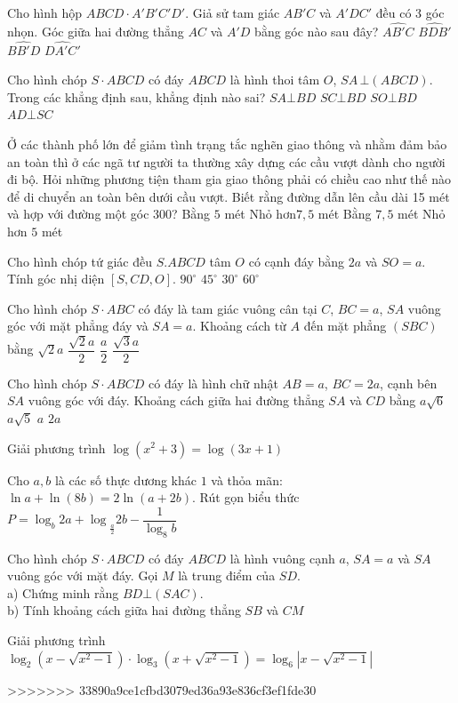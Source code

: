 \begin{ex}
Cho hình hộp $ABCD \cdot A'B'C'D'$. Giả sử tam giác $AB'C$ và $A'DC'$ đều có 3 góc nhọn. Góc giữa hai đường thẳng $AC$ và $A'D$ bằng góc nào sau đây?
\choice
{$\widehat{AB'C}$}
{$\widehat{BDB'}$}
{$\widehat{BB'D}$}
{$\widehat{DA'C'}$}
\end{ex}
\begin{ex}
Cho hình chóp $S \cdot ABCD$ có đáy $ABCD$ là hình thoi tâm $O$, $SA\,\bot (ABCD)$. Trong các khẳng định sau, khẳng định nào sai?
\choice
{$SA\bot BD$}
{$SC\bot BD$}
{$SO\bot BD$}
{$AD\bot SC$}
\end{ex}
\begin{ex}
Ở các thành phố lớn để giảm tình trạng tắc nghẽn giao thông và nhằm đảm bảo an toàn thì ở các ngã tư người ta thường xây dựng các cầu vượt dành cho người đi bộ. Hỏi những phương tiện tham gia giao thông phải có chiều cao như thế nào để di chuyển an toàn bên dưới cầu vượt. Biết rằng đường dẫn lên cầu dài 15 mét và hợp với đường một góc 300?
\choice
{Bằng $5$ mét}
{Nhỏ hơn$7{,}5$ mét}
{Bằng $7{,}5$ mét}
{Nhỏ hơn $5$ mét}
\end{ex}
\begin{ex}
Cho hình chóp tứ giác đều $S.ABCD$ tâm $O$ có cạnh đáy bằng $2a$ và $SO=a$. Tính góc nhị diện $\left[S, CD, O\right]$.
\choice
{$90^\circ $}
{$45^\circ $}
{$30^\circ$}
{$60^\circ $}
\end{ex}
\begin{ex}
Cho hình chóp $S \cdot ABC$ có đáy là tam giác vuông cân tại $C$, $BC=a$, $SA$ vuông góc với mặt phẳng đáy và $SA=a$. Khoảng cách từ $A$ đến mặt phẳng $(SBC)$ bằng
\choice
{$\sqrt{2}a$}
{$\dfrac{\sqrt{2}a}{2}$}
{$\dfrac{a}{2}$}
{$\dfrac{\sqrt{3}a}{2}$}
\end{ex}
\begin{ex}
Cho hình chóp $S \cdot ABCD$ có đáy là hình chữ nhật $AB=a$, $BC=2a$, cạnh bên $SA$ vuông góc với đáy. Khoảng cách giữa hai đường thẳng $SA$ và $CD$ bằng
\choice
{$a\sqrt{6}$}
{$a\sqrt{5}$}
{$a$}
{$2a$}
\end{ex}
\begin{ex}
Giải phương trình $\log \left(x^2+3\right)=\log (3x+1)$
\end{ex}
\begin{ex}
Cho $a,b$ là các số thực dương khác $1$ và thỏa mãn: $\ln a+\ln (8b)=2\ln (a+2b)$.
Rút gọn biểu thức $P={{\log _b2a+\log }_{\tfrac{a}{2}}}2b-\dfrac{1}{\log _8b}$
\end{ex}
\begin{ex}
Cho hình chóp $S \cdot ABCD$ có đáy $ABCD$ là hình vuông cạnh $a$, $SA=a$ và $SA$ vuông góc với mặt đáy. Gọi $M$ là trung điểm của $SD$.\\ 
a) Chứng minh rằng $BD\bot (SAC)$.\\
b) Tính khoảng cách giữa hai đường thẳng $SB$ và $CM$\\
\end{ex}
\begin{ex}
Giải phương trình $\log _2\left(x-\sqrt{x^2-1}\right) \cdot \log _3\left(x+\sqrt{x^2-1}\right)=\log _6\left| x-\sqrt{x^2-1} \right|$
\end{ex}
>>>>>>> 33890a9ce1cfbd3079ed36a93e836cf3ef1fde30
